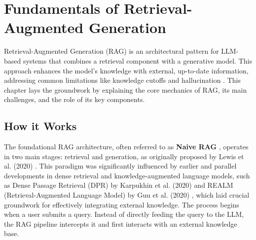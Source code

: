 \chapter{Fundamentals of Retrieval-Augmented Generation}
\label{chap:fundamentals_rag}

Retrieval-Augmented Generation (RAG) is an architectural pattern for LLM-based systems that combines a retrieval component with a generative model. This approach enhances the model's knowledge with external, up-to-date information, addressing common limitations like knowledge cutoffs and hallucination \autocite{lewis2020retrieval, gao2024retrievalaugmented}. This chapter lays the groundwork by explaining the core mechanics of RAG, its main challenges, and the role of its key components.

\section{How it Works}
The foundational RAG architecture, often referred to as \textbf{Naive RAG} \autocite{gao2024retrievalaugmented}, operates in two main stages: retrieval and generation, as originally proposed by Lewis et al. (2020) \autocite{lewis2020retrieval}. This paradigm was significantly influenced by earlier and parallel developments in dense retrieval and knowledge-augmented language models, such as Dense Passage Retrieval (DPR) by Karpukhin et al. (2020) \autocite{karpukhin2020dense} and REALM (Retrieval-Augmented Language Model) by Guu et al. (2020) \autocite{guu2020realm}, which laid crucial groundwork for effectively integrating external knowledge. The process begins when a user submits a query. Instead of directly feeding the query to the LLM, the RAG pipeline intercepts it and first interacts with an external knowledge base.

